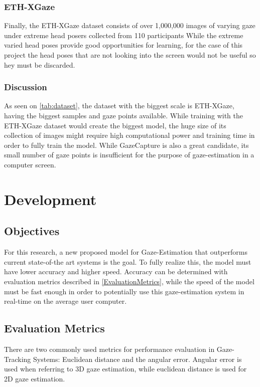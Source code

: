 \subsection{ETH-XGaze}
Finally, the ETH-XGaze dataset \cite{Zhang2020ETHXGaze} consists of over 1,000,000 images of varying gaze under extreme head posers collected from 110 participants While the extreme varied head poses provide good opportunities for learning, for the case of this project the head poses that are not looking into the screen would not be useful so hey must be discarded.



\subsection{Discussion}
As seen on \autoref{tab:dataset}, the dataset with the biggest scale is ETH-XGaze, having the biggest samples and gaze points available. 
While training with the ETH-XGaze dataset would create the biggest model, the huge size of its collection of images might require high computational
power and training time in order to fully train the model. While GazeCapture is also a great candidate, its small number of gaze points 
is insufficient for the purpose of gaze-estimation in a computer screen.

\chapter{Development}
\label{Chap3}


\section{Objectives}
For this research, a new proposed model for Gaze-Estimation that outperforms current state-of-the art systems is 
the goal. To fully realize this, the model must have lower accuracy and higher speed.
Accuracy can be determined with evaluation metrics described in \autoref{EvaluationMetrics}, while the speed of the model
must be fast enough in order to potentially use this gaze-estimation system in real-time on the average user computer.

\section{Evaluation Metrics}
\label{EvaluationMetrics}
There are two commonly used metrics for performance evaluation in Gaze-Tracking Systems:
Euclidean distance and the angular error. Angular error is used when referring to 3D gaze estimation, while euclidean distance is used for 2D gaze estimation.


